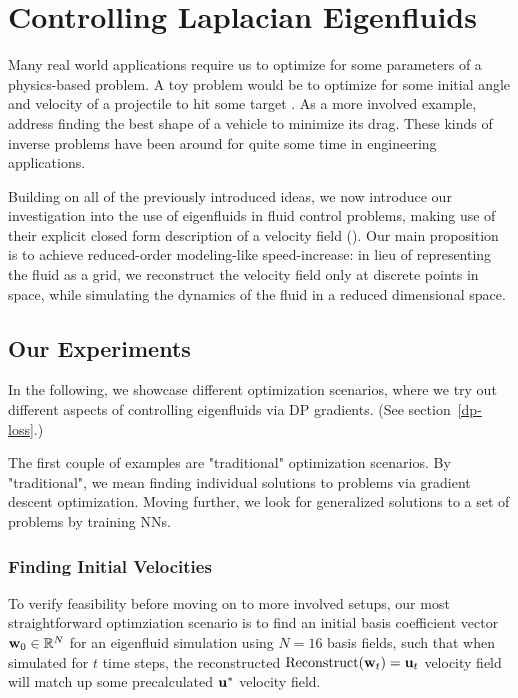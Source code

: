 \chapter{Controlling Laplacian Eigenfluids}
Many real world applications require us to optimize for some parameters of
a physics-based problem. A toy problem would be to optimize for some initial
angle and velocity of a projectile to hit some target . As a more involved example, \cite{MinDrag} address
finding the best shape of a vehicle to minimize its drag. These kinds of
inverse problems have been around for quite some time in engineering
applications.

Building on all of the previously introduced ideas, we now introduce our
investigation into the use of eigenfluids in fluid control problems, making use
of their explicit closed form description of a velocity field (). Our main proposition is to achieve reduced-order modeling-like
speed-increase: in lieu of representing the fluid as a grid, we reconstruct the
velocity field only at discrete points in space, while simulating the dynamics
of the fluid in a reduced dimensional space.



\section{Our Experiments}
In the following, we showcase different optimization scenarios, where we try out
different aspects of controlling eigenfluids via \acf{DP} gradients. (See
section~\ref{dp-loss}.)

The first couple of examples are "traditional" optimization scenarios. By
"traditional", we mean finding individual solutions to problems via gradient
descent optimization. Moving further, we look for generalized solutions to a set
of problems by training \acfp{NN}.

\subsection{Finding Initial Velocities}
To verify feasibility before moving on to more involved setups, our most
straightforward optimziation scenario is to find an initial basis coefficient
vector $\vb{w}_0 \in \mathbb{R}^N$ for an eigenfluid simulation using $N=16$
basis fields, such that when simulated for $t$ time steps, the reconstructed
$\text{Reconstruct}(\vb{w}_t) = \vb{u}_t$ velocity field will match up some
precalculated $\vb{u}^*$ velocity field.

